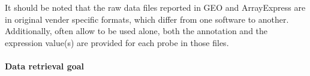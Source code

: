 It should be noted that the raw data files reported in GEO and ArrayExpress are 
in original vender specific formats, which differ from one software to another.
%
%
Additionally, often allow to be used alone, both the annotation and the
expression value(s) are provided for each probe in those files.







\paragraph{Data retrieval goal}\label{sec:command-data-goal}

